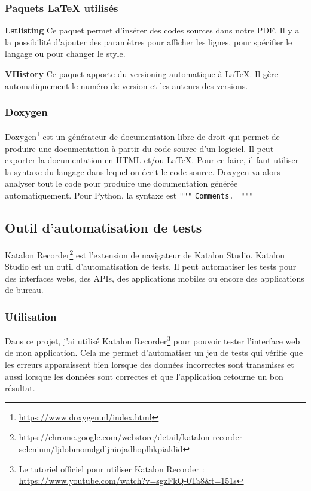 \documentclass[a4paper,14pt]{extarticle}
\begin{document}
{\subsubsection{Paquets \LaTeX{} utilisés}

\noindent\textbf{Lstlisting}
Ce paquet permet d'insérer des codes sources dans notre PDF. Il y a la possibilité d'ajouter des paramètres pour afficher les lignes, pour spécifier le langage ou pour changer le style.

\noindent\textbf{VHistory}
Ce paquet apporte du versioning automatique à \LaTeX. Il gère automatiquement le numéro de version et les auteurs des versions.

\subsubsection{Doxygen}
Doxygen\footnote{\url{https://www.doxygen.nl/index.html}} est un générateur de documentation libre de droit qui permet de produire une documentation à partir du code source d'un logiciel. Il peut exporter la documentation en HTML et/ou \LaTeX{}. Pour ce faire, il faut utiliser la syntaxe du langage dans lequel on écrit le code source. Doxygen va alors analyser tout le code pour produire une documentation générée automatiquement. Pour Python, la syntaxe est \newline 
\texttt{"""} \newline
\texttt{Comments. } \newline
\texttt{"""} \newline

\subsection{Outil d'automatisation de tests}
\label{outilAutomatisationTest}

Katalon Recorder\footnote{\url{https://chrome.google.com/webstore/detail/katalon-recorder-selenium/ljdobmomdgdljniojadhoplhkpialdid}} est l'extension de navigateur de Katalon Studio. Katalon Studio est un outil d'automatisation de tests. Il peut automatiser les tests pour des interfaces webs, des APIs, des applications mobiles ou encore des applications de bureau.

\subsubsection{Utilisation}

Dans ce projet, j'ai utilisé Katalon Recorder\footnote{Le tutoriel officiel pour utiliser Katalon Recorder : \url{https://www.youtube.com/watch?v=sgzFkQ-0Ta8&t=151s}} pour pouvoir tester l'interface web de mon application. Cela me permet d'automatiser un jeu de tests qui vérifie que les erreurs apparaissent bien lorsque des données incorrectes sont transmises et aussi lorsque les données sont correctes et que l'application retourne un bon résultat.

}
\end{document}
